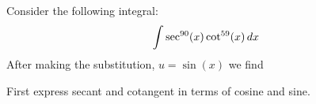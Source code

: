 \documentclass{ximera}
\author{Bart Snapp}
\begin{document}
\begin{exercise}
  Consider the following integral:
  \[
  \int \sec^{90}(x) \cot^{59}(x)  \mathop{}\!d x
  \]
  After making the substitution, $u = \sin(x)$ we find
  \begin{hint}
    First express secant and cotangent in terms of cosine and sine.
  \end{hint}
  \begin{multipleChoice}
  \end{multipleChoice}
\end{exercise}
\end{document}

